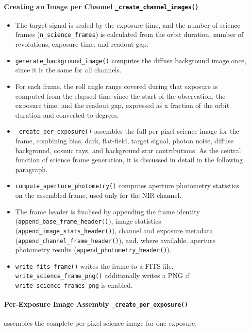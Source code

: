 \paragraph{Creating an Image per Channel \texttt{\_create\_channel\_images()}}
\begin{itemize}
    \item The target signal is scaled by the exposure time, and the number of science frames (\texttt{n\_science\_frames}) is calculated from the orbit duration, number of revolutions, exposure time, and readout gap.

    \item \texttt{generate\_background\_image()} computes the diffuse background image once, since it is the same for all channels.

    \item For each frame, the roll angle range covered during that exposure is computed from the elapsed time since the start of the observation, the exposure time, and the readout gap, expressed as a fraction of the orbit duration and converted to degrees.

    \item \texttt{\_create\_per\_exposure()} assembles the full per-pixel science image for the frame, combining bias, dark, flat-field, target signal, photon noise, diffuse background, cosmic rays, and background star contributions. As the central function of science frame generation, it is discussed in detail in the following paragraph.

    \item \texttt{compute\_aperture\_photometry()} computes aperture photometry statistics on the assembled frame, used only for the NIR channel.

    \item The frame header is finalised by appending the frame identity (\texttt{append\allowbreak\_base\allowbreak\_frame\_header()}), image statistics (\texttt{append\_image\_stats\_header()}), channel and exposure metadata (\texttt{append\allowbreak\_channel\allowbreak\_frame\allowbreak\_header()}), and, where available, aperture photometry results (\texttt{append\_photometry\_header()}).

    \item \texttt{write\_fits\_frame()} writes the frame to a FITS file. \texttt{write\_science\_frame\_png()} additionally writes a PNG if \texttt{write\_science\_frames\_png} is enabled.
\end{itemize}

\paragraph{Per-Exposure Image Assembly \texttt{\_create\_per\_exposure()}} assembles the complete per-pixel science image for one exposure.

